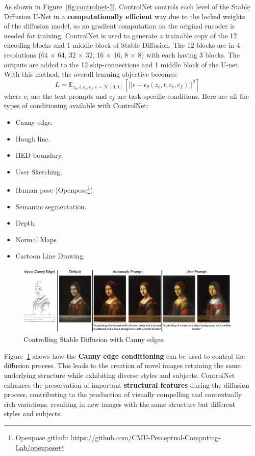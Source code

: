 \documentclass[preprint]{elsarticle}
\begin{document}
As shown in Figure~\ref{fig:controlnet-2}, ControlNet controls each level of the Stable Diffusion U-Net in a 
\textbf{computationally efficient} way due to the locked weights of the diffusion model, so no gradient computation on the original 
encoder is needed for training. 
ControlNet is used to generate a trainable copy of the 12 encoding blocks and 1 middle block of Stable Diffusion. The 12 blocks are in 4 resolutions (64 × 64, 32 × 32, 16 × 16, 8 × 8) with
each having 3 blocks. The outputs are added to the 12 skip-connections and 1 middle block of the
U-net.
With this method, the overall learning objective becomes:
\begin{equation}
	L = \mathbb{E}_{z_0,t,c_t,c_f,\epsilon \sim \mathcal{N}(0,1)}\left[||\epsilon-\epsilon_\theta(z_t,t,c_t,c_f)||^2 \right]
\end{equation}
where $c_t$ are the text prompts and $c_f$ are task-specific conditions.
Here are all the types of conditioning available with ControlNet:
\begin{itemize}
	\item Canny edge.
	\item Hough line.
	\item HED boundary.
	\item User Sketching.
	\item Human pose (Openpose\footnote{Openpose github: \url{https://github.com/CMU-Perceptual-Computing-Lab/openpose}}).
	\item Semantic segmentation.
	\item Depth.
	\item Normal Maps.
	\item Cartoon Line Drawing.
\end{itemize}

\begin{figure}[t]
	\centering
	\includegraphics[scale=0.8]{img/background_img/ControlnetDemo.png}
	\caption{Controlling Stable Diffusion with Canny edges.}
	\label{fig:canny}
\end{figure}

Figure~\ref{fig:canny} shows how the \textbf{Canny edge conditioning} can be used to control the diffusion process.
This leads to the creation of novel images retaining the same underlying structure while exhibiting diverse styles and subjects.
ControlNet enhances the preservation of important \textbf{structural features} during the diffusion process, contributing to the production of visually compelling and contextually rich variations.
resulting in new images with the same structure but different styles and subjects.
\end{document}
